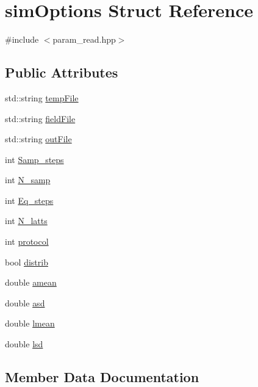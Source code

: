 \hypertarget{structsimOptions}{}\section{sim\+Options Struct Reference}
\label{structsimOptions}


{\ttfamily \#include $<$param\+\_\+read.\+hpp$>$}

\subsection*{Public Attributes}
\begin{DoxyCompactItemize}
\item 
std\+::string \hyperlink{structsimOptions_a42a20f246c7029967d29a15e4d5aac16}{temp\+File}
\item 
std\+::string \hyperlink{structsimOptions_afb799330b8e40d76661b590ce0e792e6}{field\+File}
\item 
std\+::string \hyperlink{structsimOptions_ad95991f4f13947624c4e44ea12845c18}{out\+File}
\item 
int \hyperlink{structsimOptions_a5890487eea2252d4d84f67615269128f}{Samp\+\_\+steps}
\item 
int \hyperlink{structsimOptions_a94b0e70bb9de2b53a815b67879929b65}{N\+\_\+samp}
\item 
int \hyperlink{structsimOptions_a68e2dc1a21bc70873cdd518cf90b01f0}{Eq\+\_\+steps}
\item 
int \hyperlink{structsimOptions_a22e632d6787e16c4a95781ea672184ba}{N\+\_\+latts}
\item 
int \hyperlink{structsimOptions_a0b1b41d907adf31c75d5b9e9a413931d}{protocol}
\item 
bool \hyperlink{structsimOptions_ac515e118d7c1c579e0cf9e789c1c6926}{distrib}
\item 
double \hyperlink{structsimOptions_a8af2a6dac9cbe680605b83147dca9b96}{amean}
\item 
double \hyperlink{structsimOptions_a97b27544bdce1f29971f1501a15a3fe5}{asd}
\item 
double \hyperlink{structsimOptions_a4f77eb0b474df8666c76e29c322d4276}{lmean}
\item 
double \hyperlink{structsimOptions_aa167da0ff74e6ba414e67213f67abd2f}{lsd}
\end{DoxyCompactItemize}


\subsection{Member Data Documentation}
